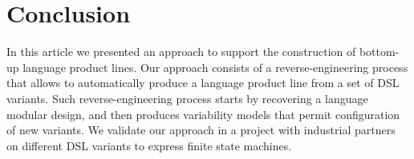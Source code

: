 \section{Conclusion}
\label{sec:conclusions}

In this article we presented an approach to support the construction of bottom-up language product lines. Our approach consists of a reverse-engineering process that allows to automatically produce a language product line from a set of DSL variants. Such reverse-engineering process starts by recovering a language modular design, and then produces variability models that permit configuration of new variants. We validate our approach in a project with industrial partners on different DSL variants to express finite state machines. 
